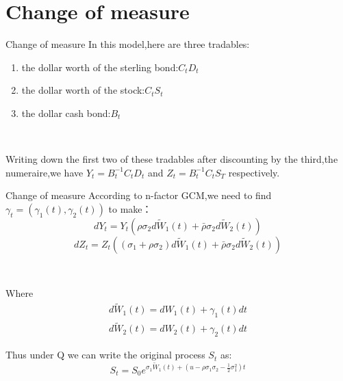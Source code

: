 \documentclass[15pt]{beamer}
\begin{document}
\section{Change of measure}
	\begin{frame}{Change of measure}
		In this model,here are three tradables:
		\begin{enumerate}
			\item the dollar worth of the sterling bond:$C_tD_t$
			\item the dollar worth of the stock:$C_tS_t$
			\item the dollar cash bond:$B_t$
		\end{enumerate}
		
		\
		
		Writing down the first two of these tradables after discounting by the third,the numeraire,we have $Y_t=B_t^{-1}C_tD_t$ and $Z_t=B_t^{-1}C_tS_T$ respectively. 
	
	\end{frame}




	\begin{frame}{Change of measure}
		According to n-factor GCM,we need to find $\gamma_t=(\gamma_1(t),\gamma_2(t))$ to make：
		\begin{equation}
			dY_t=Y_t\left(\rho \sigma_2 d \tilde{W}_1(t) + \bar {\rho} \sigma_2 d \tilde {W}_2(t)\right)
		\end{equation}
		\begin{equation}
			dZ_t=Z_t\left((\sigma_1+\rho \sigma_2) d \tilde{W}_1(t)+\bar {\rho} \sigma_2 d\tilde{W}_2(t)\right)
		\end{equation}
		
		\
		
		Where
		\begin{align}
		d\tilde {W}_1(t)=dW_1(t)+\gamma_1(t)dt\\
		d\tilde {W}_2(t)=dW_2(t)+\gamma_2(t)dt
		\end{align}
		
		Thus under Q we can write the original process $S_t$ as:
		\begin{equation}
			S_t=S_0e^{\sigma_1\tilde W_1(t) +(u -\rho \sigma_1 \sigma_2 -\frac{1}{2}\sigma_1^2)t}
		\end{equation}
		
	\end{frame}
\end{document}

